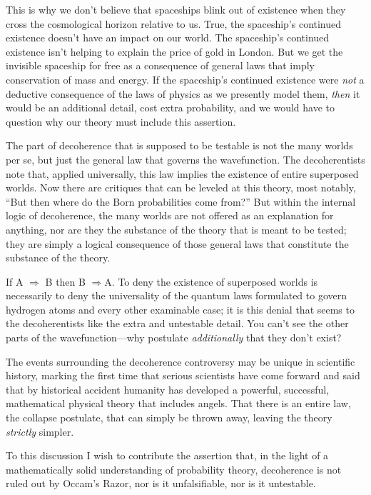 {
 This is why we don't believe that spaceships blink
out of existence when they cross the cosmological horizon relative to
us. True, the spaceship's continued existence
doesn't have an impact on our world. The
spaceship's continued existence isn't
helping to explain the price of gold in London. But we get the
invisible spaceship for free as a consequence of general laws that
imply conservation of mass and energy. If the
spaceship's continued existence were \textit{not} a
deductive consequence of the laws of physics as we presently model
them, \textit{then} it would be an additional detail, cost extra
probability, and we would have to question why our theory must include
this assertion.}

{
 The part of decoherence that is supposed to be testable is not the
many worlds per se, but just the general law that governs the
wavefunction. The decoherentists note that, applied universally, this
law implies the existence of entire superposed worlds. Now there are
critiques that can be leveled at this theory, most notably,
``But then where do the Born probabilities come
from?'' But within the internal logic of decoherence,
the many worlds are not offered as an explanation for anything, nor are
they the substance of the theory that is meant to be tested; they are
simply a logical consequence of those general laws that constitute the
substance of the theory.}

{
 If A $\Rightarrow $ B then {\textlnot}B $\Rightarrow
${\textlnot}A. To deny the existence of superposed worlds is
necessarily to deny the universality of the quantum laws formulated to
govern hydrogen atoms and every other examinable case; it is this
denial that seems to the decoherentists like the extra and untestable
detail. You can't see the other parts of the
wavefunction---why postulate \textit{additionally} that they
don't exist?}

{
 The events surrounding the decoherence controversy may be unique
in scientific history, marking the first time that serious scientists
have come forward and said that by historical accident humanity has
developed a powerful, successful, mathematical physical theory that
includes angels. That there is an entire law, the collapse postulate,
that can simply be thrown away, leaving the theory \textit{strictly}
simpler.}

{
 To this discussion I wish to contribute the assertion that, in the
light of a mathematically solid understanding of probability theory,
decoherence is not ruled out by Occam's Razor, nor is
it unfalsifiable, nor is it untestable.}

